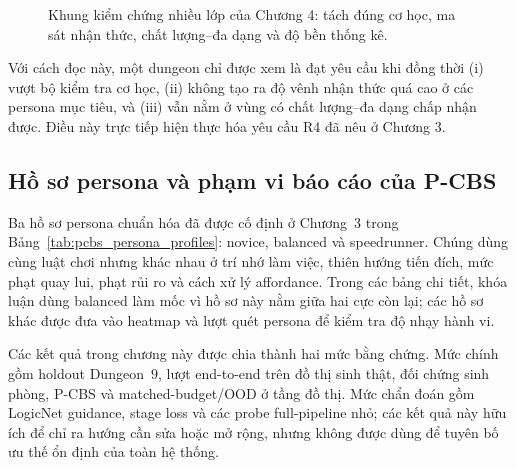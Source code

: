 \documentclass[oneside,a4paper,12pt]{extreport}
\begin{document}
\begin{figure}[H]
\centering
{}
\caption{Khung kiểm chứng nhiều lớp của Chương 4: tách đúng cơ học, ma sát nhận thức, chất lượng--đa dạng và độ bền thống kê.}
\label{fig:chapter4_evaluation_layers}
\end{figure}

Với cách đọc này, một dungeon chỉ được xem là đạt yêu cầu khi đồng thời (i) vượt bộ kiểm tra cơ học, (ii) không tạo ra độ vênh nhận thức quá cao ở các persona mục tiêu, và (iii) vẫn nằm ở vùng có chất lượng--đa dạng chấp nhận được. Điều này trực tiếp hiện thực hóa yêu cầu R4 đã nêu ở Chương 3.

\subsection{Hồ sơ persona và phạm vi báo cáo của P-CBS}
Ba hồ sơ persona chuẩn hóa đã được cố định ở Chương~3 trong Bảng~\ref{tab:pcbs_persona_profiles}: novice, balanced và speedrunner. Chúng dùng cùng luật chơi nhưng khác nhau ở trí nhớ làm việc, thiên hướng tiến đích, mức phạt quay lui, phạt rủi ro và cách xử lý affordance. Trong các bảng chi tiết, khóa luận dùng balanced làm mốc vì hồ sơ này nằm giữa hai cực còn lại; các hồ sơ khác được đưa vào heatmap và lượt quét persona để kiểm tra độ nhạy hành vi.

Các kết quả trong chương này được chia thành hai mức bằng chứng. Mức chính gồm holdout Dungeon~$9$, lượt end-to-end trên đồ thị sinh thật, đối chứng sinh phòng, P-CBS và matched-budget/OOD ở tầng đồ thị. Mức chẩn đoán gồm LogicNet guidance, stage loss và các probe full-pipeline nhỏ; các kết quả này hữu ích để chỉ ra hướng cần sửa hoặc mở rộng, nhưng không được dùng để tuyên bố ưu thế ổn định của toàn hệ thống.
\end{document}
